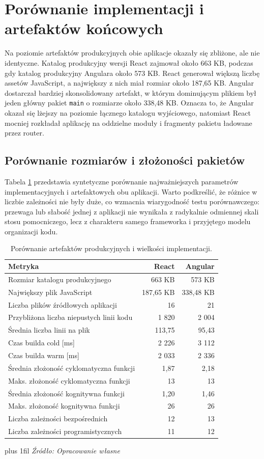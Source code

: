 \documentclass[12pt,openright,twoside]{report}
\newcommand{\source}[1]{{\par\vspace{5pt}\noindent\leftskip=0pt \rightskip=0pt \parfillskip=0pt plus 1fil \footnotesize\textit{Źródło: #1}\par}}
\begin{document}
\section{Porównanie implementacji i artefaktów końcowych}
Na poziomie artefaktów produkcyjnych obie aplikacje okazały się zbliżone, ale nie identyczne. Katalog produkcyjny wersji React zajmował około 663 KB, podczas gdy katalog produkcyjny Angulara około 573 KB. React generował większą liczbę assetów JavaScript, a największy z nich miał rozmiar około 187,65 KB. Angular dostarczał bardziej skonsolidowany artefakt, w którym dominującym plikiem był jeden główny pakiet \texttt{main} o rozmiarze około 338,48 KB. Oznacza to, że Angular okazał się lżejszy na poziomie łącznego katalogu wyjściowego, natomiast React mocniej rozkładał aplikację na oddzielne moduły i fragmenty pakietu ładowane przez router.

\subsection{Porównanie rozmiarów i złożoności pakietów}
Tabela \ref{tab:artifact-comparison} przedstawia syntetyczne porównanie najważniejszych parametrów implementacyjnych i artefaktowych obu aplikacji. Warto podkreślić, że różnice w liczbie zależności nie były duże, co wzmacnia wiarygodność testu porównawczego: przewaga lub słabość jednej z aplikacji nie wynikała z radykalnie odmiennej skali stosu pomocniczego, lecz z charakteru samego frameworka i przyjętego modelu organizacji kodu.

\begin{table}[H]
\centering
\caption{Porównanie artefaktów produkcyjnych i wielkości implementacji.}
\label{tab:artifact-comparison}
\begin{tabular}{|l|r|r|}
\hline
\textbf{Metryka} & \textbf{React} & \textbf{Angular} \\
\hline
Rozmiar katalogu produkcyjnego & 663 KB & 573 KB \\
Największy plik JavaScript & 187,65 KB & 338,48 KB \\
Liczba plików źródłowych aplikacji & 16 & 21 \\
Przybliżona liczba niepustych linii kodu & 1 820 & 2 004 \\
Średnia liczba linii na plik & 113,75 & 95,43 \\
Czas builda cold [ms] & 2 226 & 3 112 \\
Czas builda warm [ms] & 2 033 & 2 336 \\
Średnia złożoność cyklomatyczna funkcji & 1,87 & 2,18 \\
Maks. złożoność cyklomatyczna funkcji & 13 & 13 \\
Średnia złożoność kognitywna funkcji & 1,20 & 1,46 \\
Maks. złożoność kognitywna funkcji & 26 & 26 \\
Liczba zależności bezpośrednich & 12 & 13 \\
Liczba zależności programistycznych & 11 & 12 \\
\hline
\end{tabular}
\source{Opracowanie własne}
\end{table}
\end{document}
